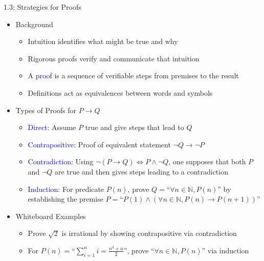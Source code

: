 \documentclass[10pt,english]{beamer}
\begin{document}
\begin{frame}{1.3: Strategies for Proofs}

\begin{itemize}
\setlength\itemsep{3mm}
\item<1-> Background
\begin{itemize} 
 \setlength\itemsep{1.5mm}
 \item Intuition identifies what might be true and why
 \item Rigorous proofs verify and communicate that intuition
 \item A \textcolor{blue}{proof} is a sequence of verifiable steps from premises to the result
 \item Definitions act as equivalences between words and symbols 
\end{itemize}

\item<2-> Types of Proofs for $P \rightarrow Q$
\begin{itemize} 
 \setlength\itemsep{1.5mm}
 \item \textcolor{blue}{Direct}: Assume $P$ true and give steps that lead to $Q$
 \item \textcolor{blue}{Contrapositive}: Proof of equivalent statement $\neg Q \rightarrow \neg P$
 \item \textcolor{blue}{Contradiction}: Using $\neg (P \rightarrow Q) \Leftrightarrow P \wedge \neg Q$, one supposes that both $P$ and $\neg Q$ are true and then gives steps leading to a contradiction
 \item \textcolor{blue}{Induction}: For predicate $P(n)$, prove $Q=$``$\forall n\in\mathbb{N}, P(n)$'' by establishing the premise $P=$``$P(1) \wedge (\forall n\in \mathbb{N}, P(n) \rightarrow P(n\!+\!1))$''
\end{itemize}

\item<3-> Whiteboard Examples \vspace{1mm}
\begin{itemize} 
 \setlength\itemsep{1.5mm}
 \item Prove $\sqrt{2}$ is irrational by showing contrapositive via contradiction
 \item For $P(n)=$``$\sum_{i=1}^n i = \frac{n^2 + n}{2}$'', prove ``$\forall n\in \mathbb{N}, P(n)$'' via induction
\end{itemize}
\end{itemize}

\end{frame} 
\end{document}

